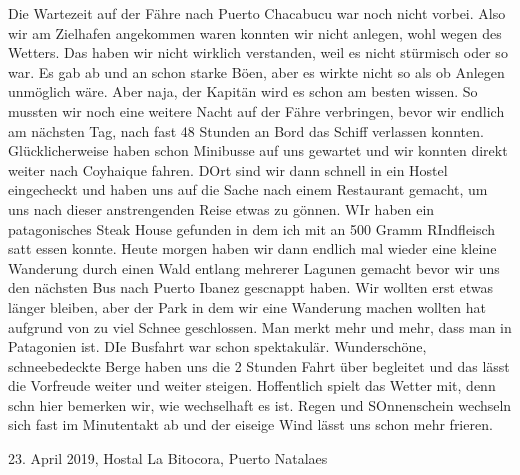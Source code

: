 \documentclass[11pt]{book}
\begin{document}
Die Wartezeit auf der Fähre nach Puerto Chacabucu war noch nicht vorbei. Also wir am Zielhafen angekommen waren konnten wir nicht 
anlegen, wohl wegen des Wetters. Das haben wir nicht wirklich verstanden, weil es nicht stürmisch oder so war. Es gab ab und an 
schon starke Böen, aber es wirkte nicht so als ob Anlegen unmöglich wäre. Aber naja, der Kapitän wird es schon am besten wissen. So 
mussten wir noch eine weitere Nacht auf der Fähre verbringen, bevor wir endlich am nächsten Tag, nach fast 48 Stunden an Bord das 
Schiff verlassen konnten. Glücklicherweise haben schon Minibusse auf uns gewartet und wir konnten direkt weiter nach Coyhaique 
fahren. DOrt sind wir dann schnell in ein Hostel eingecheckt und haben uns auf die Sache nach einem Restaurant gemacht, um uns 
nach dieser anstrengenden Reise etwas zu gönnen. WIr haben ein patagonisches Steak House gefunden in dem ich mit an 500 Gramm 
RIndfleisch satt essen konnte. Heute morgen haben wir dann endlich mal wieder eine kleine Wanderung durch einen Wald entlang mehrerer 
Lagunen gemacht bevor wir uns den nächsten Bus nach Puerto Ibanez gescnappt haben. Wir wollten erst etwas länger bleiben, aber der 
Park in dem wir eine Wanderung machen wollten hat aufgrund von zu viel Schnee geschlossen. Man merkt mehr und mehr, dass man in 
Patagonien ist. DIe Busfahrt war schon spektakulär. Wunderschöne, schneebedeckte Berge haben uns die 2 Stunden Fahrt über begleitet 
und das lässt die Vorfreude weiter und weiter steigen. Hoffentlich spielt das Wetter mit, denn schn hier bemerken wir, wie wechselhaft 
es ist. Regen und SOnnenschein wechseln sich fast im Minutentakt ab und der eiseige Wind lässt uns schon mehr frieren. 


23. April 2019, Hostal La Bitocora, Puerto Natalaes 
\end{document}

